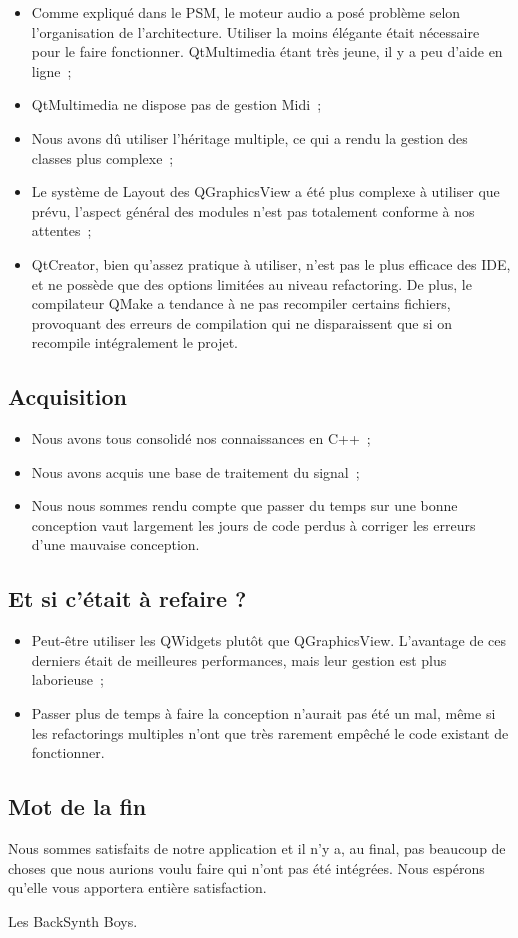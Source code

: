 \begin{itemize}
\item
  Comme expliqué dans le PSM, le moteur audio a posé problème selon
  l'organisation de l'architecture. Utiliser la moins élégante était
  nécessaire pour le faire fonctionner. QtMultimedia étant très
  jeune, il y a peu d'aide en ligne~;
\item
  QtMultimedia ne dispose pas de gestion Midi~;
\item
  Nous avons dû utiliser l'héritage multiple, ce qui a rendu la
  gestion des classes plus complexe~;
\item
  Le système de Layout des QGraphicsView a été plus complexe à
  utiliser que prévu, l'aspect général des modules n'est pas
  totalement conforme à nos attentes~;
\item
  QtCreator, bien qu'assez pratique à utiliser, n'est pas le plus
  efficace des IDE, et ne possède que des options limitées au niveau
  refactoring. De plus, le compilateur QMake a tendance à ne pas
  recompiler certains fichiers, provoquant des erreurs de compilation
  qui ne disparaissent que si on recompile intégralement le projet.
\end{itemize}

\subsection{Acquisition}

\begin{itemize}
\item
  Nous avons tous consolidé nos connaissances en C++~;
\item
  Nous avons acquis une base de traitement du signal~;
\item
  Nous nous sommes rendu compte que passer du temps sur une bonne
  conception vaut largement les jours de code perdus à corriger les
  erreurs d'une mauvaise conception.
\end{itemize}

\subsection{Et si c'était à refaire ?}

\begin{itemize}
\item
  Peut-être utiliser les QWidgets plutôt que QGraphicsView.
  L'avantage de ces derniers était de meilleures performances, mais
  leur gestion est plus laborieuse~;
\item
  Passer plus de temps à faire la conception n'aurait pas été un mal,
  même si les refactorings multiples n'ont que très rarement empêché
  le code existant de fonctionner.
\end{itemize}

\subsection{Mot de la fin}

Nous sommes satisfaits de notre application et il n'y a, au final,
pas beaucoup de choses que nous aurions voulu faire qui n'ont pas
été intégrées. Nous espérons qu'elle vous apportera entière
satisfaction.

Les BackSynth Boys.

